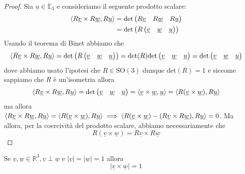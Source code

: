 \begin{proof}
Sia $\underline{u} \in \mathbb{E}_3$ e consideriamo il seguente prodotto scalare:
%
\begin{align*}
\langle R\underline{v} \times R\underline{w}, R\underline{u} \rangle &= \text{det}\begin{pmatrix}
R\underline{v} & R\underline{w} & R\underline{u}
\end{pmatrix} \\
&= \text{det}\left(R \begin{pmatrix}
\underline{v} & \underline{w} & \underline{u} 
\end{pmatrix}\right)
\end{align*}
%
Usando il teorema di Binet abbiamo che
%
\[\langle R\underline{v} \times R\underline{w}, R\underline{u} \rangle = \text{det}\left(R \begin{pmatrix}
\underline{v} & \underline{w} & \underline{u} 
\end{pmatrix}\right) = \text{det}(R)\text{det}\begin{pmatrix}
\underline{v} & \underline{w} & \underline{u} 
\end{pmatrix} = \text{det}\begin{pmatrix}
	\underline{v} & \underline{w} & \underline{u}
\end{pmatrix}\]
%
dove abbiamo usato l'ipotesi che $R \in \text{SO}(3)$ dunque $\text{det}(R) = 1$ e siccome sappiamo che $R$ è un'isometria allora
%
\[\langle R\underline{v} \times R\underline{w}, R\underline{u} \rangle = \text{det}\begin{pmatrix} \underline{v} & \underline{w} & \underline{u} \end{pmatrix} = \langle \underline{v} \times \underline{w}, \underline{u} \rangle = \langle R(\underline{v} \times \underline{w}), R\underline{u} \rangle\]
%
ma allora $\langle R\underline{v} \times R\underline{w}, R\underline{u} \rangle = \langle R(\underline{v} \times \underline{w}), R\underline{u} \rangle \implies \langle R(\underline{v} \times \underline{w}) - (R\underline{v} \times R\underline{w}), R\underline{u} \rangle = 0$. Ma allora, per la coercività del prodotto scalare, abbiamo necessariamente che
%
\[R(\underline{v} \times \underline{w}) = R\underline{v} \times R\underline{w}\]
\end{proof}
%
\vspace{0.5cm}
\begin{prop}
Se $\underline{v}, \underline{w} \in \mathbb{R}^3, \underline{v} \perp \underline{w}$ e $|\underline{v}| = |\underline{w}| = 1$ allora
\[
|\underline{v} \times \underline{w}| = 1
\]
\label{prop:norm_unit_cross_prod}
\end{prop}
